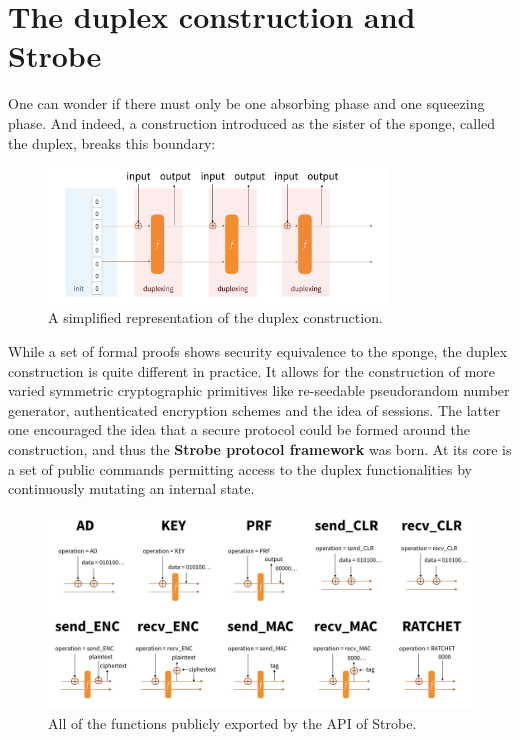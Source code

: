 \documentclass{article}
\begin{document}
\section{The duplex construction and Strobe}

One can wonder if there must only be one absorbing phase and one squeezing phase. And indeed, a construction introduced as the sister of the sponge, called the duplex, breaks this boundary:

\begin{figure}[H]
\centering
\includegraphics[width=0.8\textwidth]{rwcimg/duplex.png}
\caption{A simplified representation of the duplex construction.}
\end{figure}

While a set of formal proofs shows security equivalence to the sponge, the duplex construction is quite different in practice. It allows for the construction of more varied symmetric cryptographic primitives like re-seedable pseudorandom number generator, authenticated encryption schemes and the idea of sessions. The latter one encouraged the idea that a secure protocol could be formed around the construction, and thus the \textbf{Strobe protocol framework} was born. At its core is a set of public commands permitting access to the duplex functionalities by continuously mutating an internal state.

\begin{figure}[H]
\centering
\includegraphics[width=\textwidth]{rwcimg/strobe.png}
\caption{All of the functions publicly exported by the API of Strobe.}
\label{fig:strobe}
\end{figure}
\end{document}
